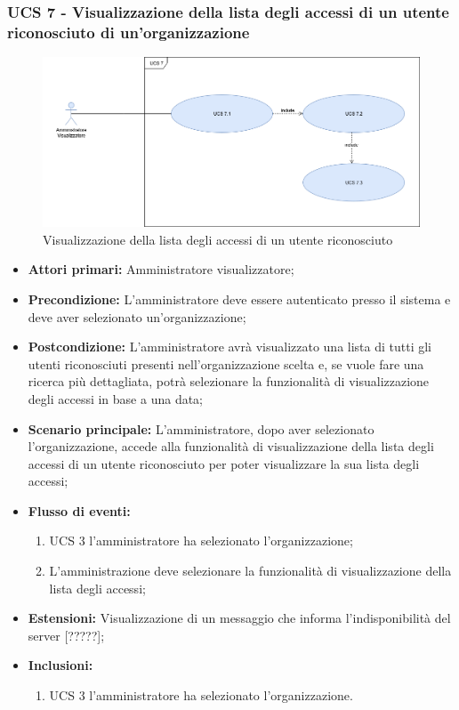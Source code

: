 \newpage

\subsubsection{UCS 7 - Visualizzazione della lista degli accessi di un utente riconosciuto di un'organizzazione}

\begin{figure}[h]
	\centering
	\includegraphics[scale=0.3]{sezioni/UseCase/Immagini/UCS7.png}
	\caption{Visualizzazione della lista degli accessi di un utente riconosciuto}
\end{figure}

\begin{itemize}
\item \textbf{Attori primari:} Amministratore visualizzatore;
\item \textbf{Precondizione:} L’amministratore deve essere autenticato presso il sistema e deve aver selezionato un'organizzazione;
\item \textbf{Postcondizione:} L’amministratore avrà visualizzato una lista di tutti gli utenti riconosciuti presenti nell'organizzazione scelta e, se vuole fare una ricerca più dettagliata, potrà selezionare la funzionalità di visualizzazione degli accessi in base a una data;
\item \textbf{Scenario principale:} L’amministratore, dopo aver selezionato l'organizzazione, accede alla funzionalità di visualizzazione della lista degli accessi di un utente riconosciuto per poter visualizzare la sua lista degli accessi;
\item \textbf{Flusso di eventi:} 
\begin{enumerate}
	\item UCS 3 l'amministratore ha selezionato l'organizzazione;
	\item L'amministrazione deve selezionare la funzionalità di visualizzazione della lista degli accessi;
\end{enumerate}
\item \textbf{Estensioni:} Visualizzazione di un messaggio che informa l’indisponibilità del server [?????];
\item \textbf{Inclusioni:}
\begin{enumerate}
	\item UCS 3 l'amministratore ha selezionato l'organizzazione.
\end{enumerate}
\end{itemize}

